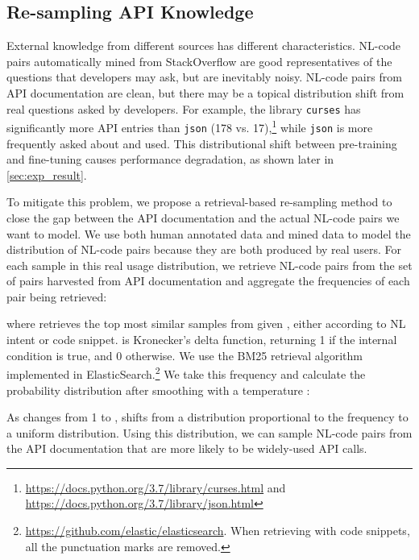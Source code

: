\documentclass[11pt,a4paper]{article}
\begin{document}
\subsection{Re-sampling API Knowledge}
\label{sec:re-sampling}



External knowledge from different sources has different characteristics.
NL-code pairs automatically mined from StackOverflow are good representatives of the questions that developers may ask, but are inevitably noisy.
NL-code pairs from API documentation are clean, but there may be a topical distribution shift from real questions asked by developers.
For example, the library \texttt{curses} has significantly more API entries than \texttt{json} (178 vs. 17),\footnote{\url{https://docs.python.org/3.7/library/curses.html} and \url{https://docs.python.org/3.7/library/json.html}} while \texttt{json} is more frequently asked about and used.
This distributional shift between pre-training and fine-tuning causes performance degradation, as shown later in \autoref{sec:exp_result}.






To mitigate this problem, we propose a retrieval-based re-sampling method to close the gap between the API documentation and the actual NL-code pairs we want to model.
We use both human annotated data  and mined data  to model the distribution of NL-code pairs because they are both produced by real users.
For each sample in this real usage distribution, we retrieve  NL-code pairs from the set of pairs harvested from API documentation  and aggregate the frequencies of each pair  being retrieved:

where  retrieves the top  most similar samples from  given , either according to NL intent or code snippet.
 is Kronecker's delta function, returning 1 if the internal condition is true, and 0 otherwise. 
We use the BM25 retrieval algorithm \cite{SPARCKJONES2000779} implemented in ElasticSearch.\footnote{\url{https://github.com/elastic/elasticsearch}. When retrieving with code snippets, all the punctuation marks are removed.}
We take this frequency and calculate the probability distribution after smoothing with a temperature :

As  changes from 1 to ,  shifts from a distribution proportional to the frequency to a uniform distribution.
Using this distribution, we can sample NL-code pairs from the API documentation that are more likely to be widely-used API calls.
\end{document}
